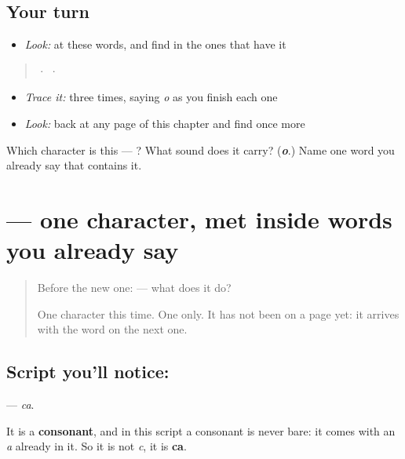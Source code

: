 \subsection*{Your turn}
\begin{itemize}
\raggedright
  \item \emph{Look:} at these words, and find  in the ones that have it
\end{itemize}

\begin{quote}
  ·    ·  
\end{quote}

\begin{itemize}
\raggedright
  \item \emph{Trace it:}  three times, saying \emph{o} as you finish each one
  \item \emph{Look:} back at any page of this chapter and find  once more
\end{itemize}

\begin{tcolorbox}[breakable,colback=teal!4,colframe=teal!35!black,title={Before you move on}]
Which character is this — ? What sound does it carry? (\emph{\textbf{o}}.) Name one word you already say that contains it.
\end{tcolorbox}
\section[\texorpdfstring{\ml{ച} (ca)}{ച (ca)}]{ — one character, met inside words you already say}

\label{lesson:ML-S111-letter-ca}



\begin{quote}
Before the new one:  — what does it do?

One character this time. One only. It has not been on a page yet: it arrives with the word on the next one.
\end{quote}

\subsection*{Script you'll notice: }
\textbf{} — \emph{ca}.

It is a \textbf{consonant}, and in this script a consonant is never bare: it comes with an \emph{a} already in it. So it is not \emph{c}, it is \textbf{ca}.

